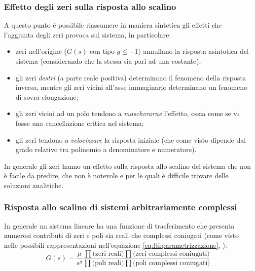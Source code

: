 		\subsubsection{Effetto degli zeri sulla risposta allo scalino}
			A questo punto è possibile riassumere in maniera sintetica gli effetti che l'aggiunta degli zeri provoca sul sistema, in particolare:
			\begin{itemize}
				\item zeri nell'origine ($G(s)$ con tipo $g\leq -1$) annullano la risposta asintotica del sistema (considerando che la stessa sia pari ad una costante);
				\item gli zeri \textit{destri} (a parte reale positiva) determinano il fenomeno della risposta inversa, mentre gli zeri vicini all'asse immaginario determinano un fenomeno di sovra-elongazione;
				\item gli zeri vicini ad un polo tendono a \textit{mascherarne} l'effetto, ossia come se vi fosse una cancellazione critica nel sistema;
				\item gli zeri tendono a \textit{velocizzare} la risposta iniziale (che come visto dipende dal grado relativo tra polinomio a denominatore e numeratore).				
			\end{itemize}
			In generale gli zeri hanno un effetto sulla risposta allo scalino del sistema che non è facile da predire, che non è notevole e per le quali è difficile trovare delle soluzioni analitiche.
			
		\subsubsection{Risposta allo scalino di sistemi arbitrariamente complessi}
			In generale un sistema lineare ha una funzione di trasferimento che presenta numerosi contributi di zeri e poli sia reali che complessi coniugati (come visto nelle possibili rappresentazioni nell'equazione \ref{eq:lti:parametrizzazione}, \pageref{eq:lti:parametrizzazione}):
			\[ G(s) = \frac \mu {s^g} \frac{\prod\big(\textrm{zeri reali}\big) \prod \big(\textrm{zeri complessi coniugati}\big)}{\prod\big(\textrm{poli reali}\big) \prod \big(\textrm{poli complessi coniugati}\big)} \]
			
